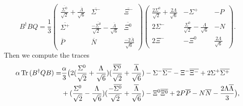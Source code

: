 \documentclass[main.tex]{subfiles}
\begin{document}
\begin{equation}
B^{\dagger}BQ=\frac{1}{3}\begin{pmatrix} \frac{\overline{\Sigma^0}}{\sqrt{2}}+\frac{\overline{\Lambda}}{\sqrt{6}}&\overline{\Sigma^-} &\overline{\Xi^-}\\ \overline{\Sigma^+} & \frac{-\overline{\Sigma^0}}{\sqrt{2}}-\frac{\overline{\Lambda}}{\sqrt{6}}&\overline{\Xi^0}\\ \overline{P} & \overline{N}& \frac{-2\overline{\Lambda}}{\sqrt{6}}\end{pmatrix}
\begin{pmatrix}
\frac{2\Sigma^0}{\sqrt{2}}+\frac{2\Lambda}{\sqrt{6}}&-\Sigma^+ &-P\\ 2\Sigma^- & \frac{\Sigma^0}{\sqrt{2}}-\frac{\Lambda}{\sqrt{6}}&-N\\ 2\Xi^- & -\Xi^0& \frac{2\Lambda}{\sqrt{6}}
\end{pmatrix}.
\end{equation}
Then we compute the traces
\begin{equation}\label{eqn:tr1}
\begin{split}
\alpha\operatorname{Tr}{(B^{\dagger}QB)}=&\frac{\alpha}{3}\big(  2(\frac{\Sigma^0}{\sqrt{2}}+\frac{\Lambda}{\sqrt{6}})(\frac{\overline{\Sigma^0}}{\sqrt{2}}+\frac{\overline{\Lambda}}{\sqrt{6}}) -\Sigma^-\overline{\Sigma^-}-\Xi^-\overline{\Xi^-}+2\Sigma^
+\overline{\Sigma^+}\nonumber\\& +(\frac{\Sigma^0}{\sqrt{2}}-\frac{\Lambda}{\sqrt{6}})(\frac{-\overline{\Sigma^0}}{\sqrt{2}}+\frac{\overline{\Lambda}}{\sqrt{6}})-\Xi^0\overline{\Xi^0}+2P\overline{P}-N\overline{N}-\frac{2\Lambda\overline{\Lambda}}{3}\big),
\end{split}
\end{equation}
\end{document}
